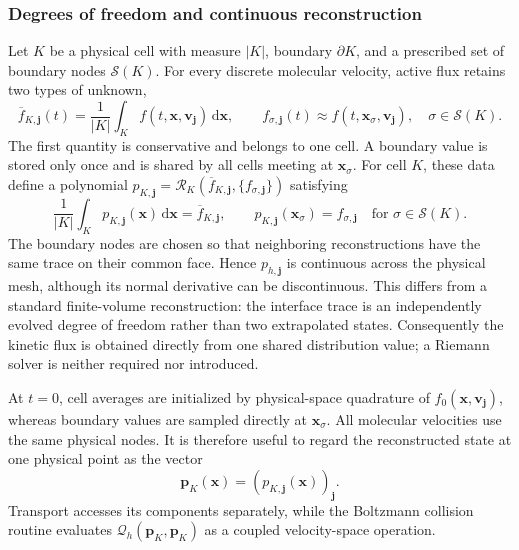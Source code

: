\documentclass[preprint,3p,12pt]{elsarticle}
\newcommand{\dd}{\,\mathrm{d}}
\newcommand{\vct}[1]{\boldsymbol{#1}}
\newcommand{\avg}[1]{\overline{#1}}
\begin{document}
\subsubsection{Degrees of freedom and continuous reconstruction}

Let $K$ be a physical cell with measure $|K|$, boundary $\partial K$, and a prescribed set of boundary nodes $\mathcal{S}(K)$. For every discrete molecular velocity, active flux retains two types of unknown,
\begin{equation}
  \avg{f}_{K,\vct{j}}(t)
  =\frac{1}{|K|}\int_K f(t,\vct{x},\vct{v}_{\vct{j}})\dd\vct{x},
  \qquad
  f_{\sigma,\vct{j}}(t)
  \approx f(t,\vct{x}_{\sigma},\vct{v}_{\vct{j}}),
  \quad \sigma\in\mathcal{S}(K).
  \label{eq:active-flux-dofs}
\end{equation}
The first quantity is conservative and belongs to one cell. A boundary value is stored only once and is shared by all cells meeting at $\vct{x}_{\sigma}$. For cell $K$, these data define a polynomial $p_{K,\vct{j}}=\mathcal{R}_K(\avg{f}_{K,\vct{j}},\{f_{\sigma,\vct{j}}\})$ satisfying
\begin{equation}
  \frac{1}{|K|}\int_K p_{K,\vct{j}}(\vct{x})\dd\vct{x}
  =\avg{f}_{K,\vct{j}},
  \qquad
  p_{K,\vct{j}}(\vct{x}_{\sigma})=f_{\sigma,\vct{j}}
  \quad\text{for }\sigma\in\mathcal{S}(K).
  \label{eq:active-flux-reconstruction-conditions}
\end{equation}
The boundary nodes are chosen so that neighboring reconstructions have the same trace on their common face. Hence $p_{h,\vct{j}}$ is continuous across the physical mesh, although its normal derivative can be discontinuous. This differs from a standard finite-volume reconstruction: the interface trace is an independently evolved degree of freedom rather than two extrapolated states. Consequently the kinetic flux is obtained directly from one shared distribution value; a Riemann solver is neither required nor introduced.

At $t=0$, cell averages are initialized by physical-space quadrature of $f_0(\vct{x},\vct{v}_{\vct{j}})$, whereas boundary values are sampled directly at $\vct{x}_{\sigma}$. All molecular velocities use the same physical nodes. It is therefore useful to regard the reconstructed state at one physical point as the vector
\begin{equation}
  \vct{p}_K(\vct{x})
  =\left(p_{K,\vct{j}}(\vct{x})\right)_{\vct{j}}.
  \label{eq:reconstructed-velocity-vector}
\end{equation}
Transport accesses its components separately, while the Boltzmann collision routine evaluates $\mathcal{Q}_h(\vct{p}_K,\vct{p}_K)$ as a coupled velocity-space operation.
\end{document}
